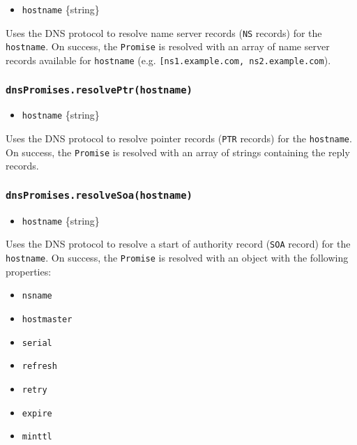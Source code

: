 \begin{itemize}
\tightlist
\item
  \texttt{hostname} \{string\}
\end{itemize}

Uses the DNS protocol to resolve name server records (\texttt{NS}
records) for the \texttt{hostname}. On success, the \texttt{Promise} is
resolved with an array of name server records available for
\texttt{hostname} (e.g.
\texttt{{[}\textquotesingle{}ns1.example.com\textquotesingle{},\ \textquotesingle{}ns2.example.com\textquotesingle{}{]}}).

\subsubsection{\texorpdfstring{\texttt{dnsPromises.resolvePtr(hostname)}}{dnsPromises.resolvePtr(hostname)}}\label{dnspromises.resolveptrhostname}

\begin{itemize}
\tightlist
\item
  \texttt{hostname} \{string\}
\end{itemize}

Uses the DNS protocol to resolve pointer records (\texttt{PTR} records)
for the \texttt{hostname}. On success, the \texttt{Promise} is resolved
with an array of strings containing the reply records.

\subsubsection{\texorpdfstring{\texttt{dnsPromises.resolveSoa(hostname)}}{dnsPromises.resolveSoa(hostname)}}\label{dnspromises.resolvesoahostname}

\begin{itemize}
\tightlist
\item
  \texttt{hostname} \{string\}
\end{itemize}

Uses the DNS protocol to resolve a start of authority record
(\texttt{SOA} record) for the \texttt{hostname}. On success, the
\texttt{Promise} is resolved with an object with the following
properties:

\begin{itemize}
\tightlist
\item
  \texttt{nsname}
\item
  \texttt{hostmaster}
\item
  \texttt{serial}
\item
  \texttt{refresh}
\item
  \texttt{retry}
\item
  \texttt{expire}
\item
  \texttt{minttl}
\end{itemize}

